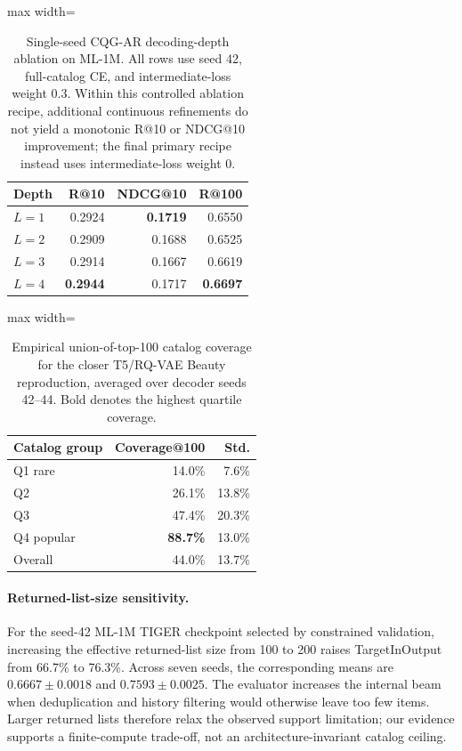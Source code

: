 \documentclass[preprint,12pt]{elsarticle}
\begin{document}
\begin{table}[!t]
\centering
\small
\setlength{\tabcolsep}{6pt}
\renewcommand{\arraystretch}{1.00}
\begin{adjustbox}{max width=\linewidth}
\begin{tabular}{lrrr}
\toprule
Depth & R@10 & NDCG@10 & R@100 \\
\midrule
\(L=1\) & 0.2924 & \textbf{0.1719} & 0.6550 \\
\(L=2\) & 0.2909 & 0.1688 & 0.6525 \\
\(L=3\) & 0.2914 & 0.1667 & 0.6619 \\
\(L=4\) & \textbf{0.2944} & 0.1717 & \textbf{0.6697} \\
\bottomrule
\end{tabular}
\end{adjustbox}
\caption{Single-seed CQG-AR decoding-depth ablation on ML-1M. All rows use
seed 42, full-catalog CE, and intermediate-loss weight 0.3. Within this
controlled ablation recipe, additional continuous refinements do not yield a
monotonic R@10 or NDCG@10 improvement; the final primary recipe instead uses
intermediate-loss weight 0.}
\label{tab:ar-depth}
\end{table}


\begin{table}[!htbp]
\centering
\small
\begin{adjustbox}{max width=\linewidth}
\begin{tabular}{lrr}
\toprule
Catalog group & Coverage@100 & Std. \\
\midrule
Q1 rare & 14.0\% & 7.6\% \\
Q2 & 26.1\% & 13.8\% \\
Q3 & 47.4\% & 20.3\% \\
Q4 popular & \textbf{88.7\%} & 13.0\% \\
\midrule
Overall & 44.0\% & 13.7\% \\
\bottomrule
\end{tabular}
\end{adjustbox}
\caption{Empirical union-of-top-100 catalog coverage for the closer T5/RQ-VAE
Beauty reproduction, averaged over decoder seeds 42--44. Bold denotes the
highest quartile coverage.}
\label{tab:faithful-coverage}
\end{table}

\paragraph{Returned-list-size sensitivity.}
For the seed-42 ML-1M TIGER checkpoint selected by constrained validation,
increasing the effective returned-list size from 100 to 200 raises
TargetInOutput from 66.7\% to 76.3\%. Across seven seeds, the corresponding
means are \(0.6667\pm0.0018\) and \(0.7593\pm0.0025\). The evaluator increases
the internal beam when deduplication and history filtering would otherwise
leave too few items. Larger returned lists therefore relax the observed
support limitation; our evidence supports a finite-compute trade-off, not an
architecture-invariant catalog ceiling.
\end{document}
